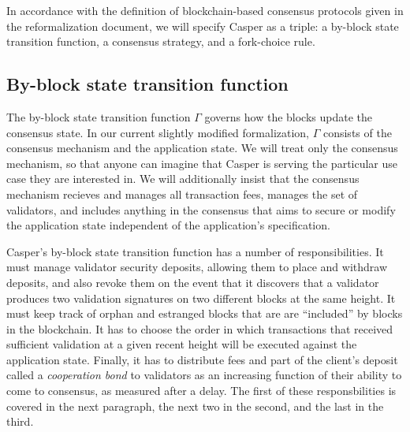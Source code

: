 \documentclass[11pt,a4paper]{article}
\begin{document}
In accordance with the definition of blockchain-based consensus protocols given in the reformalization document\cite{ReformalizingConsensus}, we will specify Casper as a triple: a by-block state transition function, a consensus strategy, and a fork-choice rule. 



\subsection{By-block state transition function}

The by-block state transition function $\Gamma$ governs how the blocks update the consensus state. In our current slightly modified formalization, $\Gamma$ consists of the consensus mechanism and the application state. We will treat only the consensus mechanism, so that anyone can imagine that Casper is serving the particular use case they are interested in. We will additionally insist that the consensus mechanism recieves and manages all transaction fees, manages the set of validators, and includes anything in the consensus that aims to secure or modify the application state independent of the application's specification. 

Casper's by-block state transition function has a number of responsibilities. It must manage validator security deposits, allowing them to place and withdraw deposits, and also revoke them on the event that it discovers that a validator produces two validation signatures on two different blocks at the same height. It must keep track of orphan and estranged blocks that are are ``included'' by blocks in the blockchain. It has to choose the order in which transactions that received sufficient validation at a given recent height will be executed against the application state. Finally, it has to distribute fees and part of the client's deposit called a \emph{cooperation bond} to validators as an increasing function of their ability to come to consensus, as measured after a delay. The first of these responsbilities is covered in the next paragraph, the next two in the second, and the last in the third.
\end{document}
